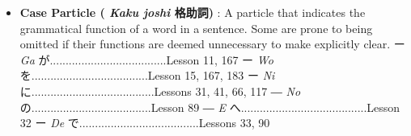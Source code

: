 \begin{itemize}

\item \textbf{Case Particle ( \emph{Kaku joshi }格助詞) }: A particle that indicates the grammatical function of a word in a sentence. Some are prone to being omitted if their functions are deemed unnecessary to make explicitly clear. \hfill\break
 \hfill\break
ー \emph{Ga }が\dothyp{}\dothyp{}\dothyp{}\dothyp{}\dothyp{}\dothyp{}\dothyp{}\dothyp{}\dothyp{}\dothyp{}\dothyp{}\dothyp{}\dothyp{}\dothyp{}\dothyp{}\dothyp{}\dothyp{}\dothyp{}\dothyp{}\dothyp{}\dothyp{}\dothyp{}\dothyp{}\dothyp{}\dothyp{}\dothyp{}\dothyp{}\dothyp{}\dothyp{}\dothyp{}\dothyp{}\dothyp{}\dothyp{}\dothyp{}\dothyp{}\dothyp{}.Lesson 11, 167 \hfill\break
ー \emph{Wo }を\dothyp{}\dothyp{}\dothyp{}\dothyp{}\dothyp{}\dothyp{}\dothyp{}\dothyp{}\dothyp{}\dothyp{}\dothyp{}\dothyp{}\dothyp{}\dothyp{}\dothyp{}\dothyp{}\dothyp{}\dothyp{}\dothyp{}\dothyp{}\dothyp{}\dothyp{}\dothyp{}\dothyp{}\dothyp{}\dothyp{}\dothyp{}\dothyp{}\dothyp{}\dothyp{}\dothyp{}\dothyp{}\dothyp{}\dothyp{}\dothyp{}\dothyp{}.Lesson 15, 167, 183 \hfill\break
ー \emph{Ni }に\dothyp{}\dothyp{}\dothyp{}\dothyp{}\dothyp{}\dothyp{}\dothyp{}\dothyp{}\dothyp{}\dothyp{}\dothyp{}\dothyp{}\dothyp{}\dothyp{}\dothyp{}\dothyp{}\dothyp{}\dothyp{}\dothyp{}\dothyp{}\dothyp{}\dothyp{}\dothyp{}\dothyp{}\dothyp{}\dothyp{}\dothyp{}\dothyp{}\dothyp{}\dothyp{}\dothyp{}\dothyp{}\dothyp{}\dothyp{}\dothyp{}\dothyp{}\dothyp{}\dothyp{}\dothyp{}Lessons 31, 41, 66, 117 \hfill\break
― \emph{No }の\dothyp{}\dothyp{}\dothyp{}\dothyp{}\dothyp{}\dothyp{}\dothyp{}\dothyp{}\dothyp{}\dothyp{}\dothyp{}\dothyp{}\dothyp{}\dothyp{}\dothyp{}\dothyp{}\dothyp{}\dothyp{}\dothyp{}\dothyp{}\dothyp{}\dothyp{}\dothyp{}\dothyp{}\dothyp{}\dothyp{}\dothyp{}\dothyp{}\dothyp{}\dothyp{}\dothyp{}\dothyp{}\dothyp{}\dothyp{}\dothyp{}\dothyp{}..Lesson 89 \hfill\break
― \emph{E }へ\dothyp{}\dothyp{}\dothyp{}\dothyp{}\dothyp{}\dothyp{}\dothyp{}\dothyp{}\dothyp{}\dothyp{}\dothyp{}\dothyp{}\dothyp{}\dothyp{}\dothyp{}\dothyp{}\dothyp{}\dothyp{}\dothyp{}\dothyp{}\dothyp{}\dothyp{}\dothyp{}\dothyp{}\dothyp{}\dothyp{}\dothyp{}\dothyp{}\dothyp{}\dothyp{}\dothyp{}\dothyp{}\dothyp{}\dothyp{}\dothyp{}\dothyp{}\dothyp{}\dothyp{}\dothyp{}.Lesson 32 \hfill\break
ー \emph{De }で\dothyp{}\dothyp{}\dothyp{}\dothyp{}\dothyp{}\dothyp{}\dothyp{}\dothyp{}\dothyp{}\dothyp{}\dothyp{}\dothyp{}\dothyp{}\dothyp{}\dothyp{}\dothyp{}\dothyp{}\dothyp{}\dothyp{}\dothyp{}\dothyp{}\dothyp{}\dothyp{}\dothyp{}\dothyp{}\dothyp{}\dothyp{}\dothyp{}\dothyp{}\dothyp{}\dothyp{}\dothyp{}\dothyp{}\dothyp{}\dothyp{}\dothyp{}..Lessons 33, 90 \hfill\break

\end{itemize}
